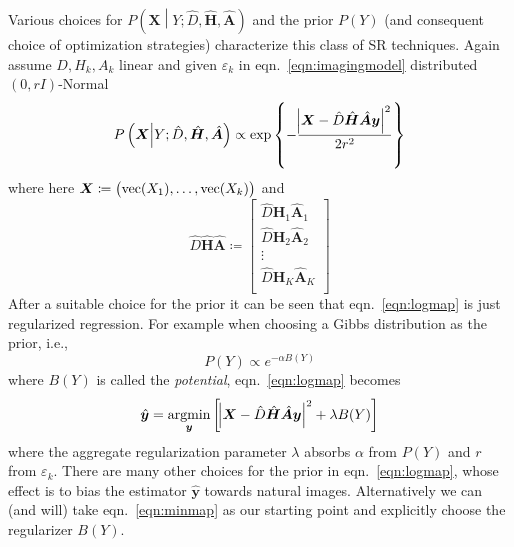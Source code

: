 %
Various choices for \(P\left(\bm{X} \middle| Y; \hat{D},  \hat{\bm{H}}, \hat{\bm{A}} \right)\) and the prior \(P(Y)\) (and consequent choice of optimization strategies) characterize this class of SR techniques.
%
Again assume \(D, H_k, A_k\) linear and given \(\varepsilon_k\) in eqn.~\eqref{eqn:imagingmodel} distributed \((0, rI)\)-Normal
\begin{equation}
    P\left(\bm{X} \middle| Y; \hat{D},  \hat{\bm{H}}, \hat{\bm{A}} \right) \propto \exp \left\{ -\frac{\abs{ \bm{X} - \hat{D} \hat{\bm{H}} \hat{\bm{A}} \bm{y} }^2}{2r^2} \right\}
\end{equation}
where here \(\bm{X} \coloneqq \left( \text{vec}(X_1), \mathellipsis, \text{vec}(X_k) \right)\) and
\begin{equation}
    \hat{D} \hat{\bm{H}} \hat{\bm{A}} \coloneqq \begin{bmatrix}
                                                    \hat{D} \hat{\bm{H}}_1 \hat{\bm{A}}_1 \\
                                                    \hat{D} \hat{\bm{H}}_2 \hat{\bm{A}}_2 \\
                                                    \vdots                                \\
                                                    \hat{D} \hat{\bm{H}}_K \hat{\bm{A}}_K \\
    \end{bmatrix}
\end{equation}
%
After a suitable choice for the prior it can be seen that eqn.~\eqref{eqn:logmap} is just regularized regression.
%
For example when choosing a Gibbs\cite{Hardie1997} distribution as the prior, i.e.,\begin{equation}
                                                                                       P(Y) \propto e^{-\alpha B(Y)}
                                                                                       \label{eqn:gibbs}
\end{equation}
where \(B(Y)\) is called the \textit{potential}, eqn.~\eqref{eqn:logmap} becomes
\begin{equation}
    \hat{\bm{y}} = \underset{\bm{y}}{\text{argmin}}\left[ \abs{ \bm{X} - \hat{D} \hat{\bm{H}} \hat{\bm{A}} \bm{y} }^2 +\lambda B(Y)\right]
    \label{eqn:minmap}
\end{equation}
where the aggregate regularization parameter \(\lambda\) absorbs \(\alpha\) from \(P(Y)\) and \(r\) from \(\varepsilon_k\).
%
There are many other choices for the prior in eqn.~\eqref{eqn:logmap}, whose effect is to bias the estimator \(\hat{\bm{y}}\) towards natural images.
%
Alternatively we can (and will) take eqn.~\eqref{eqn:minmap} as our starting point and explicitly choose the regularizer \(B(Y)\).


